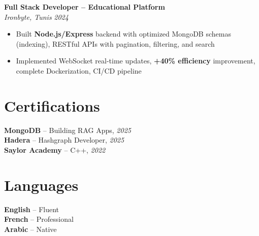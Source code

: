 \documentclass[10pt,a4paper]{article}
\begin{document}
{\vspace{3pt}
\textbf{Full Stack Developer -- Educational Platform}\\[1pt]
\textit{Ironbyte, Tunis} \hfill \textit{2024}
\begin{itemize}
  \item Built \textbf{Node.js/Express} backend with optimized MongoDB schemas (indexing), RESTful APIs with pagination, filtering, and search
  \item Implemented WebSocket real-time updates, \textbf{+40\% efficiency} improvement, complete Dockerization, CI/CD pipeline
\end{itemize}

}

\vspace{3pt}
\section*{Certifications}
{\small
\textbf{MongoDB} -- Building RAG Apps, \textit{2025}\\[1pt]
\textbf{Hadera} -- Hashgraph Developer, \textit{2025}\\[1pt]
\textbf{Saylor Academy} -- C++, \textit{2022}
}

\section*{Languages}
{\small
\textbf{English} -- Fluent\\[1pt]
\textbf{French} -- Professional\\[1pt]
\textbf{Arabic} -- Native
}
\end{document}
